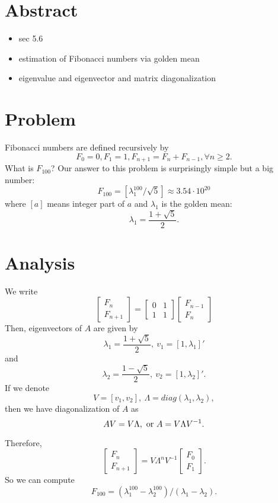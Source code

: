 \documentclass{article}
\begin{document}
\section{Abstract}
\begin{itemize}
 \item sec 5.6
 \item estimation of Fibonacci numbers via golden mean
 \item eigenvalue and eigenvector and matrix diagonalization
\end{itemize}

\section{Problem}
Fibonacci numbers are defined recursively by
$$F_{0} = 0, F_{1} = 1, F_{n+1} = F_{n} + F_{n-1}, \forall n\ge 2.$$
What is $F_{100}$?
Our answer to this problem is surprisingly simple but a big number:
$$F_{100} = [\lambda_{1}^{100}/\sqrt 5] \approx 3.54\cdot 10^{20}$$
where $[a]$ means integer part of $a$ and $\lambda_{1}$ is the golden mean:
$$\lambda_{1} = \frac{1+ \sqrt 5}{2}.$$

\section{Analysis}
We write 
$$\left[ 
\begin{array}
 {ll}
 F_{n} \\
 F_{n+1}
\end{array}
\right]
= 
\left[ 
\begin{array}
 {ll}
 0 & 1 \\
1 & 1
\end{array}
\right]
\left[ 
\begin{array}
 {ll}
 F_{n-1} \\
 F_{n}
\end{array}
\right]
$$
Then, eigenvectors of $A$ are given by
$$\lambda_{1} = \frac{1+\sqrt 5}{2}, \ v_{1} = [1, \lambda_{1}]'$$
and 
$$\lambda_{2} = \frac{1 - \sqrt 5}{2}, \ v_{2} = [1, \lambda_{2}]'.$$
If we denote
$$V = [v_{1}, v_{2}], \ \Lambda = diag(\lambda_{1}, \lambda_{2}),$$
then we have diagonalization of $A$ as
$$AV = V\Lambda, \hbox{ or } A = V \Lambda V^{-1}.$$

Therefore, 
$$
\left[
\begin{array}
 {ll}
 F_{n} \\
 F_{n+1}
\end{array}
\right]
= 
V \Lambda^{n} V^{-1} 
\left[
\begin{array}
 {ll}
 F_{0} \\
 F_{1}
\end{array}
\right].
$$
So we can compute 
$$F_{100} = (\lambda_{1}^{100} - \lambda_{2}^{100})/(\lambda_{1} - 
\lambda_{2}).$$
\end{document}
